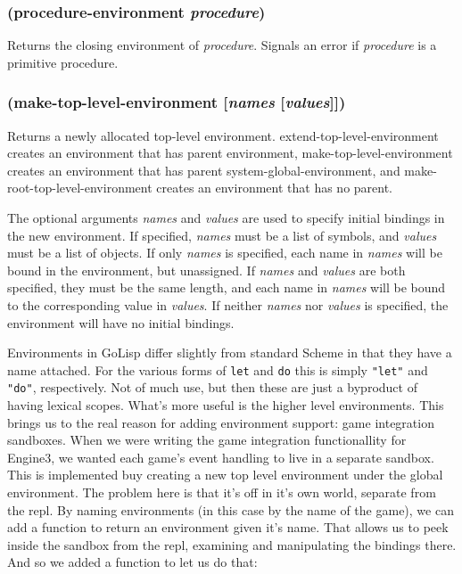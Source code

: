 \documentclass{article}
\begin{document}
\subsubsection{(procedure-environment \emph{procedure})}

Returns the closing environment of \emph{procedure}. Signals an error if \emph{procedure} is a
primitive procedure.

\subsubsection{(make-top-level-environment [\emph{names} [\emph{values}]])}

Returns a newly allocated top-level environment. extend-top-level-environment creates an
environment that has parent environment, make-top-level-environment creates an environment
that has parent system-global-environment, and make- root-top-level-environment creates an
environment that has no parent.

The optional arguments \emph{names} and \emph{values} are used to specify initial bindings in
the new environment. If specified, \emph{names} must be a list of symbols, and \emph{values}
must be a list of objects. If only \emph{names} is specified, each name in \emph{names} will
be bound in the environment, but unassigned. If \emph{names} and \emph{values} are both
specified, they must be the same length, and each name in \emph{names} will be bound to the
corresponding value in \emph{values}. If neither \emph{names} nor \emph{values} is specified,
the environment will have no initial bindings.

Environments in GoLisp differ slightly from standard Scheme in that they have a name attached.
For the various forms of \verb|let| and \verb|do| this is simply \verb|"let"| and
\verb|"do"|, respectively. Not of much use, but then these are just a byproduct of having
lexical scopes. What's more useful is the higher level environments. This brings us to the
real reason for adding environment support: game integration sandboxes. When we were writing
the game integration functionallity for Engine3, we wanted each game's event handling to live
in a separate sandbox. This is implemented buy creating a new top level environment under the
global environment. The problem here is that it's off in it's own world, separate from the
repl. By naming environments (in this case by the name of the game), we can add a function to
return an environment given it's name. That allows us to peek inside the sandbox from the
repl, examining and manipulating the bindings there. And so we added a function to let us do
that:
\end{document}
